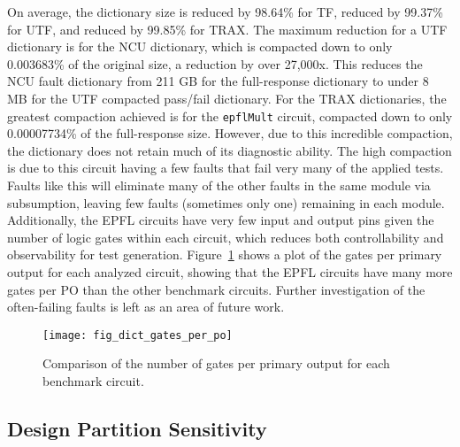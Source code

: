 On average, the dictionary size is reduced by 98.64\% for TF, reduced by 99.37\% for UTF, and reduced by 99.85\% for TRAX.
%
The maximum reduction for a UTF dictionary is for the NCU dictionary, which is compacted down to only 0.003683\% of the original size, a reduction by over 27,000x.
%
This reduces the NCU fault dictionary from 211 GB for the full-response dictionary to under 8 MB for the UTF compacted pass/fail dictionary.
%
For the TRAX dictionaries, the greatest compaction achieved is for the \verb+epflMult+ circuit, compacted down to only 0.00007734\% of the full-response size.
%
However, due to this incredible compaction, the dictionary does not retain much of its diagnostic ability.
%
The high compaction is due to this circuit having a few faults that fail very many of the applied tests.
%
Faults like this will eliminate many of the other faults in the same module via subsumption, leaving few faults (sometimes only one) remaining in each module.
%
Additionally, the EPFL circuits have very few input and output pins given the number of logic gates within each circuit, which reduces both controllability and observability for test generation.
%
Figure~\ref{fig:dict_gates_per_po} shows a plot of the gates per primary output for each analyzed circuit, showing that the EPFL circuits have many more gates per PO than the other benchmark circuits.
%
Further investigation of the often-failing faults is left as an area of future work.

\begin{figure}[htbp]
\centering
\texttt{[image: fig\_dict\_gates\_per\_po]}
\caption{Comparison of the number of gates per primary output for each benchmark circuit.}
\label{fig:dict_gates_per_po}
\end{figure}

\subsection{Design Partition Sensitivity}
\label{sec:dict_exp_partitioning}

